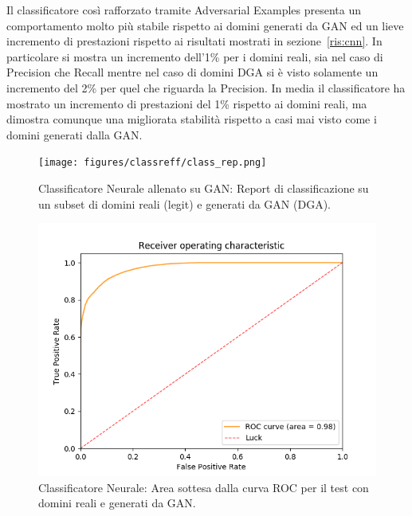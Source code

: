Il classificatore così rafforzato tramite Adversarial Examples presenta un comportamento molto più stabile rispetto ai domini generati da GAN ed un  lieve incremento di prestazioni rispetto ai risultati mostrati in sezione~\ref{ris:cnn}. In particolare si mostra un incremento dell'1\% per i domini reali, sia nel caso di Precision che Recall mentre nel caso di domini DGA si è visto solamente un incremento del 2\% per quel che riguarda la Precision. In media il classificatore ha mostrato un incremento di prestazioni del 1\% rispetto ai domini reali, ma dimostra comunque una migliorata stabilità rispetto a casi mai visto come i domini generati dalla GAN.

\begin{figure}[!bp]
    \centering
    \texttt{[image: figures/classreff/class\_rep.png]}
    \caption{Classificatore Neurale allenato su GAN: Report di classificazione su un subset di domini reali (legit) e generati da GAN (DGA).\label{fig:repnngan}}
\end{figure}

\begin{figure}[!bp]
    \centering
    \includegraphics[width=\columnwidth]{figures/classreff/roc_plot.png}
    \caption{Classificatore Neurale: Area sottesa dalla curva ROC per il test con domini reali e generati da GAN.\label{fig:rocnngan}}
\end{figure}

